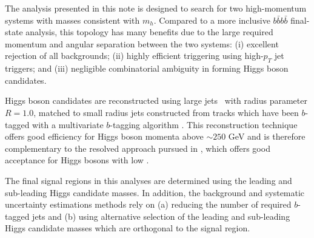 The analysis presented in this note is designed to search for two high-momentum \bbbar systems with masses consistent with $m_{h}$. Compared to a more inclusive $b\bar{b}b\bar{b}$ final-state analysis, this topology has many benefits due to the large required momentum and angular separation between the two \bbbar systems: (i) excellent rejection of all backgrounds; (ii) highly efficient triggering using high-$p_{T}$ jet triggers; and (iii) negligible combinatorial ambiguity in forming Higgs boson candidates.

Higgs boson candidates are reconstructed using large \akt jets~\cite{Cacciari:2008gp} with radius parameter $R = 1.0$, matched to small radius jets constructed from tracks which have been $b$-tagged with a multivariate $b$-tagging algorithm \cite{ATL-PHYS-PUB-2015-022}. This reconstruction technique offers good efficiency for Higgs boson momenta above $\sim 250$ GeV and is therefore complementary to the resolved approach pursued in \cite{ResolvedNote}, which offers good acceptance for Higgs bosons with low \pt.


The final signal regions in this analyses are determined using the leading and sub-leading Higgs candidate masses. In addition, the background and systematic uncertainty estimations methods rely on (a) reducing the number of required $b$-tagged jets and (b) using alternative selection of the leading and sub-leading Higgs candidate masses which are orthogonal to the signal region. 

